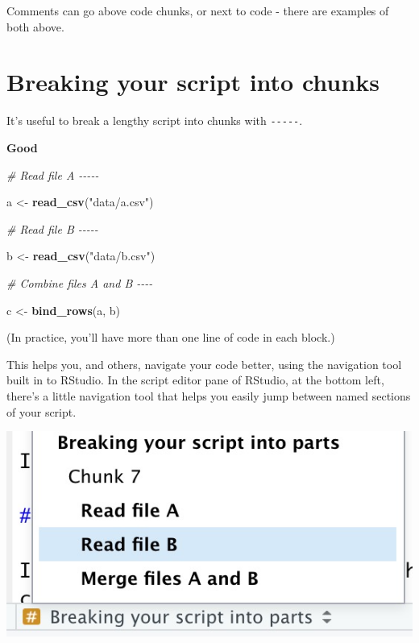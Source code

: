 \documentclass[
]{book}
\newenvironment{Shaded}{\begin{snugshade}}{\end{snugshade}}
\newcommand{\CommentTok}[1]{\textcolor[rgb]{0.56,0.35,0.01}{\textit{#1}}}
\newcommand{\KeywordTok}[1]{\textcolor[rgb]{0.13,0.29,0.53}{\textbf{#1}}}
\newcommand{\NormalTok}[1]{#1}
\newcommand{\StringTok}[1]{\textcolor[rgb]{0.31,0.60,0.02}{#1}}
\begin{document}
Comments can go above code chunks, or next to code - there are examples of both above.

\hypertarget{breaking-your-script-into-chunks}{%
\section{Breaking your script into chunks}\label{breaking-your-script-into-chunks}}

It's useful to break a lengthy script into chunks with \texttt{-\/-\/-\/-\/-}.

\textbf{Good}

\begin{Shaded}
\begin{Highlighting}[]
\CommentTok{\# Read file A {-}{-}{-}{-}{-}}

\NormalTok{a \textless{}{-}}\StringTok{ }\KeywordTok{read\_csv}\NormalTok{(}\StringTok{"data/a.csv"}\NormalTok{)}

\CommentTok{\# Read file B {-}{-}{-}{-}{-}}

\NormalTok{b \textless{}{-}}\StringTok{ }\KeywordTok{read\_csv}\NormalTok{(}\StringTok{"data/b.csv"}\NormalTok{)}

\CommentTok{\# Combine files A and B {-}{-}{-}{-}}

\NormalTok{c \textless{}{-}}\StringTok{ }\KeywordTok{bind\_rows}\NormalTok{(a, b)}
\end{Highlighting}
\end{Shaded}

(In practice, you'll have more than one line of code in each block.)

This helps you, and others, navigate your code better, using the navigation tool built in to RStudio. In the script editor pane of RStudio, at the bottom left, there's a little navigation tool that helps you easily jump between named sections of your script.

\includegraphics[width=7.64in]{atlas/rstudio_navigation}
\end{document}
